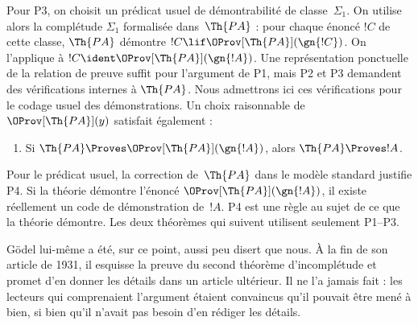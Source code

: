 \documentclass[../../../include/open-logic-section]{subfiles}
\begin{document}
Pour P3, on choisit un prédicat usuel de démontrabilité de
classe~$\Sigma_1$. On utilise alors la complétude
$\Sigma_1$ formalisée dans~$\Th{PA}$ : pour chaque énoncé
$!C$ de cette classe, $\Th{PA}$ démontre
$!C\lif\OProv[\Th{PA}](\gn{!C})$. On l'applique à
$!C\ident\OProv[\Th{PA}](\gn{!A})$. Une représentation
ponctuelle de la relation de preuve suffit pour l'argument de
P1, mais P2 et P3 demandent des vérifications internes à
$\Th{PA}$. Nous admettrons ici ces vérifications pour le
codage usuel des démonstrations.
Un choix raisonnable de $\OProv[\Th{PA}](y)$
satisfait également :
\begin{enumerate}
\item[P4.] Si
  $\Th{PA}\Proves\OProv[\Th{PA}](\gn{!A})$,
  alors $\Th{PA}\Proves !A$.
\end{enumerate}
Pour le prédicat usuel, la correction de~$\Th{PA}$ dans le
modèle standard justifie P4. Si la théorie démontre l'énoncé
$\OProv[\Th{PA}](\gn{!A})$, il existe réellement un code
de démonstration de~$!A$. P4 est une règle au sujet de ce que
la théorie démontre. Les deux théorèmes qui suivent utilisent
seulement P1--P3.

\begin{digress}
Gödel lui-même a été, sur ce point, aussi peu
disert que nous. À la fin de son article de 1931,
il esquisse la preuve du second théorème
d'incomplétude et promet d'en donner les détails
dans un article ultérieur. Il ne l'a jamais fait :
les lecteurs qui comprenaient l'argument étaient
convaincus qu'il pouvait être mené à bien, si bien
qu'il n'avait pas besoin d'en rédiger les détails.
\end{digress}
\end{document}
